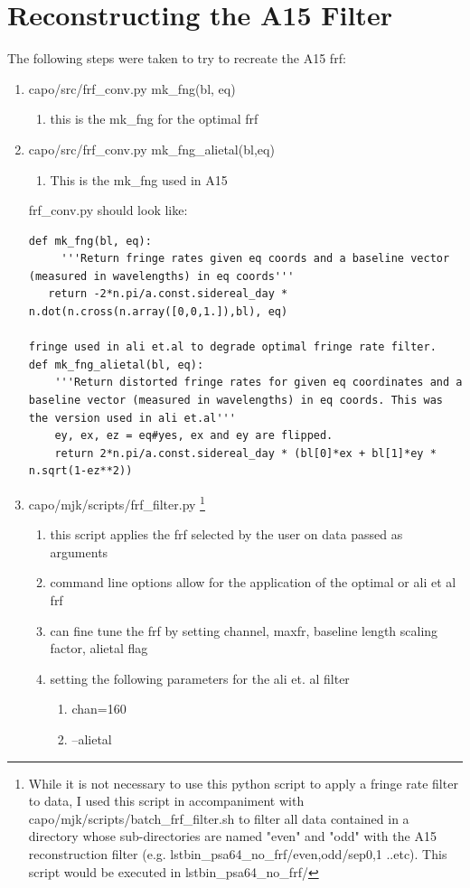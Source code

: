 \documentclass[onecolumn]{emulateapj}
\begin{document}
\section{Reconstructing the A15 Filter}{
The following steps were taken to try to recreate the A15 frf:

\begin{enumerate}
\item capo/src/frf\_conv.py  mk\_fng(bl, eq)
\begin{enumerate}
\item this is the mk\_fng for the optimal frf
\end{enumerate} 

\item capo/src/frf\_conv.py  mk\_fng\_alietal(bl,eq)
\begin{enumerate}
\item This is the mk\_fng used in A15
\end{enumerate}

frf\_conv.py should look like:
\begin{lstlisting}[firstnumber=24,name=frf_conv.py,fontadjust]
def mk_fng(bl, eq):
     '''Return fringe rates given eq coords and a baseline vector (measured in wavelengths) in eq coords'''
   return -2*n.pi/a.const.sidereal_day * n.dot(n.cross(n.array([0,0,1.]),bl), eq)
  
fringe used in ali et.al to degrade optimal fringe rate filter.
def mk_fng_alietal(bl, eq):
    '''Return distorted fringe rates for given eq coordinates and a baseline vector (measured in wavelengths) in eq coords. This was the version used in ali et.al'''
    ey, ex, ez = eq#yes, ex and ey are flipped.
    return 2*n.pi/a.const.sidereal_day * (bl[0]*ex + bl[1]*ey * n.sqrt(1-ez**2))
\end{lstlisting}

\item capo/mjk/scripts/frf\_filter.py \footnote{
While it is not necessary to use this python script to apply a fringe rate filter to data, I used this script in accompaniment with capo/mjk/scripts/batch\_frf\_filter.sh to filter all data contained in a directory whose sub-directories are named "even" and "odd"  with the A15 reconstruction filter (e.g. lstbin\_psa64\_no\_frf/{even,odd}/sep0,1 ..etc). This script would be executed in lstbin\_psa64\_no\_frf/}

\begin{enumerate}
\item this script applies the frf selected by the user on data passed as arguments
\item command line options allow for the application of the optimal or ali et al frf 
\item can fine tune the frf by setting channel, maxfr, baseline length scaling factor, alietal flag
\item setting the following parameters for the ali et. al filter
\begin{enumerate}
\item chan=160
\item --alietal
\end{enumerate}
\end{enumerate}
\end{enumerate}

}
\end{document}
